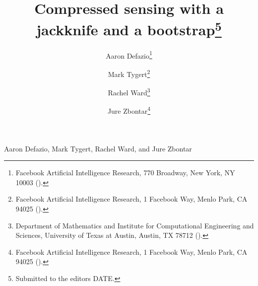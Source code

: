 

\usepackage{lipsum}
\usepackage{amsfonts}
\usepackage{graphicx}
\usepackage{epstopdf}
\usepackage{algorithmic}
\usepackage[maxfloats=128]{morefloats}
\ifpdf
\else
\fi

\usepackage{enumitem}

\newcommand{\creflastconjunction}{, and~}


{Aaron Defazio, Mark Tygert, Rachel Ward, and Jure Zbontar}

\title{Compressed sensing with a jackknife
       and a bootstrap\thanks{Submitted to the editors DATE.}}

\author{Aaron Defazio\thanks{Facebook Artificial Intelligence Research,
770 Broadway, New York, NY 10003 ().}
\and Mark Tygert\thanks{Facebook Artificial Intelligence Research,
1 Facebook Way, Menlo Park, CA 94025 ().}
\and Rachel Ward\thanks{Department of Mathematics and
Institute for Computational Engineering and Sciences, University of Texas
at Austin, Austin, TX 78712 ().}
\and Jure Zbontar\thanks{Facebook Artificial Intelligence Research,
1 Facebook Way, Menlo Park, CA 94025 ().}}

\usepackage{amsopn}
\DeclareMathOperator{\diag}{diag}


